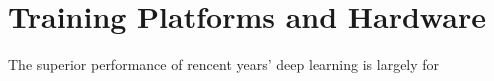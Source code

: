 \section{Training Platforms and Hardware}
The superior performance of rencent years' deep learning is largely for